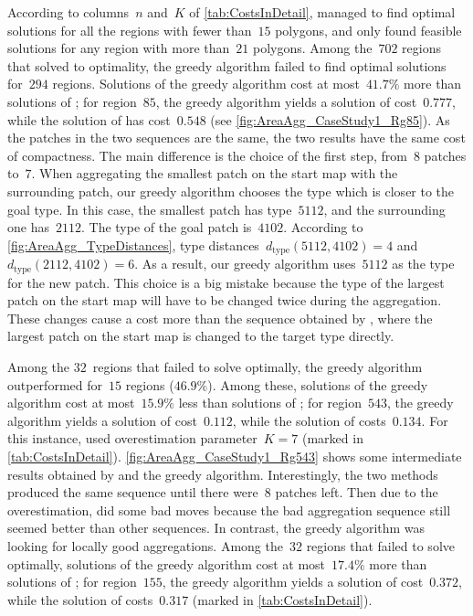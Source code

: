 \documentclass[acmsmall,natbib=false]{acmart}
\begin{document}
According to columns~$n$ and~$K$ of \tab\ref{tab:CostsInDetail},
\AstarTwo managed to find optimal solutions 
for all the regions with fewer than~$15$ polygons,
and only found feasible solutions 
for any region with more than~$21$ polygons.
Among the~$702$ regions that 
\AstarTwo solved to optimality,
the greedy algorithm failed to 
find optimal solutions for~$294$ regions.
Solutions of the greedy algorithm cost
at most~$41.7\%$ more than 
solutions of \AstarTwo;
for region~$85$, the greedy algorithm yields 
a solution of cost~$0.777$, 
while the solution of \AstarTwo has cost~$0.548$
(see \fig\ref{fig:AreaAgg_CaseStudy1_Rg85}).
As the patches in the two sequences are the same,
the two results have the same cost of compactness.
The main difference is the choice of the first step, 
from~$8$ patches to~$7$.
When aggregating the smallest patch on the start map
with the surrounding patch,
our greedy algorithm chooses the type 
which is closer to the goal type.
In this case, the smallest patch has type~$5112$, and the 
surrounding one has~$2112$.
The type of the goal patch is~$4102$.
According to \fig\ref{fig:AreaAgg_TypeDistances},
type distances~$d_\mathrm{type}(5112,4102)=4$ and~$d_\mathrm{type}(2112,4102)=6$.
As a result, our greedy algorithm uses~$5112$ 
as the type for the new patch. 
This choice is a big mistake 
because the type of the largest patch on the start map
will have to be changed twice during the aggregation.
These changes cause a cost more than the sequence obtained by 
\AstarTwo, 
where the largest patch on the start map is changed to 
the target type directly.

Among the $32$~regions that 
\AstarTwo failed to solve optimally,
the greedy algorithm outperformed \AstarTwo 
for~$15$ regions ($46.9\%$).
%
Among these, solutions of the greedy algorithm 
cost at most~$15.9\%$ less than solutions of \AstarTwo;
for region~$543$, the greedy algorithm yields 
a solution of cost~$0.112$, 
while the solution of \AstarTwo costs~$0.134$. 
For this instance, 
\AstarTwo used overestimation parameter~$K=7$
(marked in \tab\ref{tab:CostsInDetail}).
\fig\ref{fig:AreaAgg_CaseStudy1_Rg543} shows 
some intermediate results obtained by
\AstarTwo and the greedy algorithm.
Interestingly, the two methods produced the same sequence until 
there were~$8$ patches left.
Then due to the overestimation, 
\AstarTwo did some bad moves
because the bad aggregation sequence still seemed better 
than other sequences.
In contrast, the greedy algorithm was looking for locally good 
aggregations.
%
Among the~$32$ regions that 
\AstarTwo failed to solve optimally,  
solutions of the greedy algorithm cost at most~$17.4\%$ 
more than solutions of \AstarTwo; 
for region~$155$, the greedy algorithm yields 
a solution of cost~$0.372$, while
the solution of \AstarTwo costs~$0.317$
(marked in \tab\ref{tab:CostsInDetail}).
\end{document}
